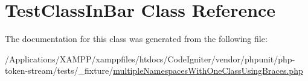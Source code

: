\hypertarget{class_foo_1_1_bar_1_1_test_class_in_bar}{}\section{Test\+Class\+In\+Bar Class Reference}
\label{class_foo_1_1_bar_1_1_test_class_in_bar}


The documentation for this class was generated from the following file\+:\begin{DoxyCompactItemize}
\item 
/\+Applications/\+X\+A\+M\+P\+P/xamppfiles/htdocs/\+Code\+Igniter/vendor/phpunit/php-\/token-\/stream/tests/\+\_\+fixture/\mbox{\hyperlink{multiple_namespaces_with_one_class_using_braces_8php}{multiple\+Namespaces\+With\+One\+Class\+Using\+Braces.\+php}}\end{DoxyCompactItemize}
